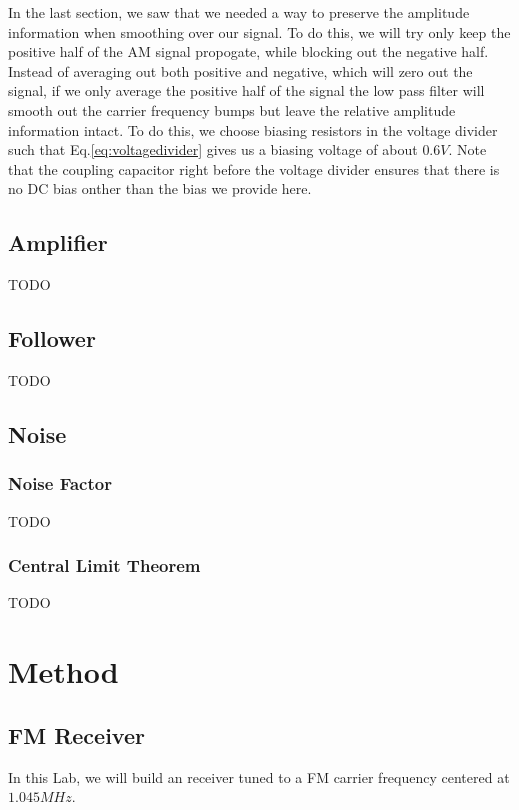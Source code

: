 \documentclass[12pt]{article}
\begin{document}
In the last section, we saw that we needed a way to preserve the amplitude information when smoothing over our signal. To do this, we will try only keep the positive half of the AM signal propogate, while blocking out the negative half. Instead of averaging out both positive and negative, which will zero out the signal, if we only average the positive half of the signal the low pass filter will smooth out the carrier frequency bumps but leave the relative amplitude information intact. To do this, we choose biasing resistors in the voltage divider such that Eq.\ref{eq:voltagedivider} gives us a biasing voltage of about $0.6V$. Note that the coupling capacitor right before the voltage divider ensures that there is no DC bias onther than the bias we provide here.

\subsection*{Amplifier}
TODO

\subsection*{Follower}
TODO

\subsection*{Noise}
\subsubsection*{Noise Factor}
TODO
\subsubsection*{Central Limit Theorem}
TODO

\section*{Method}

\subsection*{FM Receiver}
In this Lab, we will build an receiver tuned to a FM carrier frequency centered at $1.045MHz$.
\end{document}

